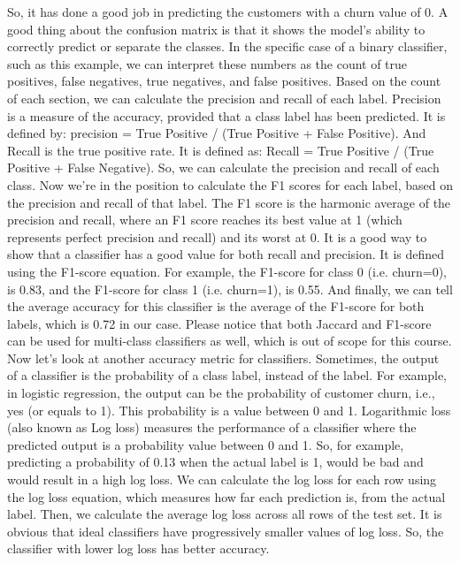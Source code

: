 	So, it has done a good job in predicting the customers with a churn value of 0. A good thing about the confusion matrix is that it shows the model’s ability to correctly predict or separate the classes. In the specific case of a binary classifier, such as this example, we can interpret these numbers as the count of true positives, false negatives, true negatives, and false positives. Based on the count of each section, we can calculate the precision and recall of each label. Precision is a measure of the accuracy, provided that a class label has been predicted. It is defined by: precision = True Positive / (True Positive + False Positive). And Recall is the true positive rate. It is defined as: Recall = True Positive / (True Positive + False Negative). So, we can calculate the precision and recall of each class. Now we’re in the position to calculate the F1 scores for each label, based on the precision and recall of that label. The F1 score is the harmonic average of the precision and recall, where an F1 score reaches its best value at 1 (which represents perfect precision and recall) and its worst at 0. It is a good way to show that a classifier has a good value for both recall and precision. It is defined using the F1-score equation. For example, the F1-score for class 0 (i.e. churn=0), is 0.83, and the F1-score for class 1 (i.e. churn=1), is 0.55. And finally, we can tell the average accuracy for this classifier is the average of the F1-score for both labels, which is 0.72 in our case. Please notice that both Jaccard and F1-score can be used for multi-class classifiers as well, which is out of scope for this course. Now let's look at another accuracy metric for classifiers. Sometimes, the output of a classifier is the probability of a class label, instead of the label. For example, in logistic regression, the output can be the probability of customer churn, i.e., yes (or equals to 1). This probability is a value between 0 and 1. Logarithmic loss (also known as Log loss) measures the performance of a classifier where the predicted output is a probability value between 0 and 1. So, for example, predicting a probability of 0.13 when the actual label is 1, would be bad and would result in a high log loss. We can calculate the log loss for each row using the log loss equation, which measures how far each prediction is, from the actual label. Then, we calculate the average log loss across all rows of the test set. It is obvious that ideal classifiers have progressively smaller values of log loss. So, the classifier with lower log loss has better accuracy. 
	
